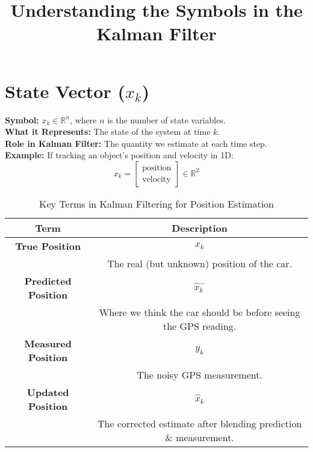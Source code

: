\documentclass{article}
\title{Understanding the Symbols in the Kalman Filter}
\author{}
\date{}
\begin{document}
\maketitle


\section{State Vector ($x_k$)}
\textbf{Symbol:} $x_k \in \mathbb{R}^{n}$, where $n$ is the number of state variables.  \\
\textbf{What it Represents:} The state of the system at time $k$.  \\
\textbf{Role in Kalman Filter:} The quantity we estimate at each time step.  \\
\textbf{Example:} If tracking an object's position and velocity in 1D:
\[
    x_k = \begin{bmatrix} \text{position} \\ \text{velocity} \end{bmatrix} \in \mathbb{R}^{2}
\]


\begin{table}[h]
    \centering
    \begin{tabular}{|c|c|}
        \hline
        \textbf{Term} & \textbf{Description} \\
        \hline
        \textbf{True Position} & $x_k$ \\
        & The real (but unknown) position of the car. \\
        \hline
        \textbf{Predicted Position} & $\hat{x}_k^-$ \\
        & Where we think the car should be before seeing the GPS reading. \\
        \hline
        \textbf{Measured Position} & $y_k$ \\
        & The noisy GPS measurement. \\
        \hline
        \textbf{Updated Position} & $\hat{x}_k$ \\
        & The corrected estimate after blending prediction \& measurement. \\
        \hline
    \end{tabular}
    \caption{Key Terms in Kalman Filtering for Position Estimation}
    \label{tab:kalman_terms}
\end{table}

\newpage

\end{document}
